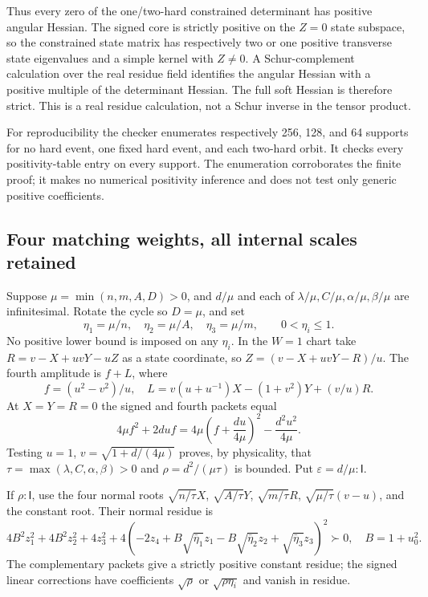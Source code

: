 \documentclass[11pt]{article}
\newcommand{\I}{\mathsf I}
\begin{document}
Thus every zero of the one/two-hard constrained determinant has positive
angular Hessian. The signed core is strictly positive on the $Z=0$
state subspace, so the constrained state matrix has respectively two
or one positive transverse state eigenvalues and a simple kernel with
$Z\ne0$. A Schur-complement calculation over the real residue field
identifies the angular Hessian with a positive multiple of the determinant
Hessian. The full soft Hessian is therefore strict. This is a real
residue calculation, not a Schur inverse in the tensor product.

For reproducibility the checker enumerates respectively 256, 128, and
64 supports for no hard event, one fixed hard event, and each two-hard
orbit. It checks every positivity-table entry on every support. The
enumeration corroborates the finite proof; it makes no numerical
positivity inference and does not test only generic positive coefficients.

\subsection{Four matching weights, all internal scales retained}

Suppose $\mu=\min(n,m,A,D)>0$, and $d/\mu$ and each of
$\lambda/\mu,C/\mu,\alpha/\mu,\beta/\mu$ are infinitesimal.
Rotate the cycle so $D=\mu$, and set
\[
\eta_1=\mu/n,\quad\eta_2=\mu/A,\quad\eta_3=\mu/m,
\qquad 0<\eta_i\le1.
\]
No positive lower bound is imposed on any $\eta_i$.
In the $W=1$ chart take $R=v-X+uvY-uZ$ as a state coordinate, so
$Z=(v-X+uvY-R)/u$. The fourth amplitude is $f+L$, where
\[
f=(u^2-v^2)/u,\quad
L=v(u+u^{-1})X-(1+v^2)Y+(v/u)R.
\]
At $X=Y=R=0$ the signed and fourth packets equal
\[
4\mu f^2+2duf
=4\mu\left(f+\frac{du}{4\mu}\right)^2-\frac{d^2u^2}{4\mu}.
\]
Testing $u=1$, $v=\sqrt{1+d/(4\mu)}$ proves, by physicality, that
$\tau=\max(\lambda,C,\alpha,\beta)>0$ and
$\rho=d^2/(\mu\tau)$ is bounded. Put $\varepsilon=d/\mu:\I$.

If $\rho:\I$, use the four normal roots
$\sqrt{n/\tau}X$, $\sqrt{A/\tau}Y$, $\sqrt{m/\tau}R$,
$\sqrt{\mu/\tau}(v-u)$, and the constant root. Their normal residue is
\[
4B^2z_1^2+4B^2z_2^2+4z_3^2+
4(-2z_4+B\sqrt{\bar\eta_1}z_1-B\sqrt{\bar\eta_2}z_2
             +\sqrt{\bar\eta_3}z_3)^2\succ0,
\quad B=1+u_0^2.
\]
The complementary packets give a strictly positive constant residue;
the signed linear corrections have coefficients $\sqrt\rho$ or
$\sqrt{\rho\eta_i}$ and vanish in residue.
\end{document}
